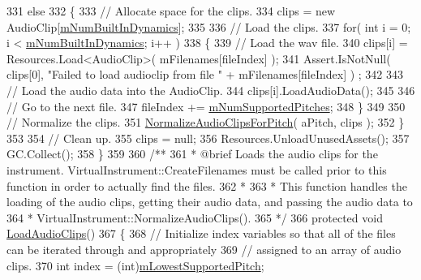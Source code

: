 \begin{DoxyCodeInclude}
331         \textcolor{keywordflow}{else}
332         \{
333             \textcolor{comment}{// Allocate space for the clips.}
334             clips = \textcolor{keyword}{new} AudioClip[\hyperlink{group___v_i_base_pro_var_gac265f64f759d267ee1e1680f8d387011}{mNumBuiltInDynamics}];
335 
336             \textcolor{comment}{// Load the clips.}
337             \textcolor{keywordflow}{for}( \textcolor{keywordtype}{int} i = 0; i < \hyperlink{group___v_i_base_pro_var_gac265f64f759d267ee1e1680f8d387011}{mNumBuiltInDynamics}; i++ )
338             \{
339                 \textcolor{comment}{// Load the wav file.}
340                 clips[i] = Resources.Load<AudioClip>( mFilenames[fileIndex] );
341                 Assert.IsNotNull( clips[0], \textcolor{stringliteral}{"Failed to load audioclip from file "} + mFilenames[fileIndex] )
      ;
342 
343                 \textcolor{comment}{// Load the audio data into the AudioClip.}
344                 clips[i].LoadAudioData();
345 
346                 \textcolor{comment}{// Go to the next file.}
347                 fileIndex += \hyperlink{group___v_i_base_pro_var_gafc759a16324cf9b3f230bcbf040afcd2}{mNumSupportedPitches};
348             \}
349 
350             \textcolor{comment}{// Normalize the clips.}
351             \hyperlink{group___v_i_base_priv_func_gaecd4f9ead08a03be878b2085055a975c}{NormalizeAudioClipsForPitch}( aPitch, clips );
352         \}
353 
354         \textcolor{comment}{// Clean up.}
355         clips = null;
356         Resources.UnloadUnusedAssets();
357         GC.Collect();
358     \}
359 \textcolor{comment}{}
360 \textcolor{comment}{    /**}
361 \textcolor{comment}{    * @brief Loads the audio clips for the instrument. VirtualInstrument::CreateFilenames must be called
       prior to this function in order to actually find the files. }
362 \textcolor{comment}{    * }
363 \textcolor{comment}{    * This function handles the loading of the audio clips, getting their audio data, and passing the audio
       data to}
364 \textcolor{comment}{    * VirtualInstrument::NormalizeAudioClips().}
365 \textcolor{comment}{    */}
366     \textcolor{keyword}{protected} \textcolor{keywordtype}{void} \hyperlink{group___v_i_base_pro_func_ga873242f52d077ca4305b0b69a0100b55}{LoadAudioClips}()
367     \{
368         \textcolor{comment}{// Initialize index variables so that all of the files can be iterated through and appropriately }
369         \textcolor{comment}{// assigned to an array of audio clips. }
370         \textcolor{keywordtype}{int} index = (int)\hyperlink{group___v_i_base_pro_var_ga3cae52b1bcc0178a8a6b03c7aaf7aac8}{mLowestSupportedPitch};

\end{DoxyCodeInclude}
